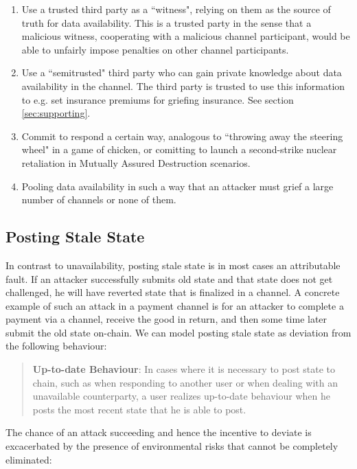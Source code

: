 \documentclass[prb,floatfix,reprint,nofootinbib,amsmath,amssymb,epsfig,pre,floats,letterpaper,groupedaffiliation,tightenlines,allcolors=blue,11pt]{revtex4}
\theoremstyle{definition}
\theoremstyle{definition}
\theoremstyle{definition}
\begin{document}
\begin{enumerate}
    \item Use a trusted third party as a ``witness", relying on them as the source of truth for data availability. This is a trusted party in the sense that a malicious witness, cooperating with a malicious channel participant, would be able to unfairly impose penalties on other channel participants.
    \item Use a ``semitrusted" third party who can gain private knowledge about data availability in the channel. The third party is trusted to use this information to e.g. set insurance premiums for griefing insurance. See section \ref{sec:supporting}.
    \item Commit to respond a certain way, analogous to ``throwing away the steering wheel" in a game of chicken, or comitting to launch a second-strike nuclear retaliation in Mutually Assured Destruction scenarios.
    \item Pooling data availability in such a way that an attacker must grief a large number of channels or none of them.
\end{enumerate}

\subsection{Posting Stale State}

In contrast to unavailability, posting stale state is in most cases an attributable fault. If an attacker successfully submits old state and that state does not get challenged, he will have reverted state that is finalized in a channel. A concrete example of such an attack in a payment channel is for an attacker to complete a payment via a channel, receive the good in return, and then some time later submit the old state on-chain. We can model posting stale state as deviation from the following behaviour:

\begin{quote}
\textbf{Up-to-date Behaviour}: In cases where it is necessary to post state to chain, such as when responding to another user or when dealing with an unavailable counterparty, a user realizes up-to-date behaviour when he posts the most recent state that he is able to post.
\end{quote}

The chance of an attack succeeding and hence the incentive to deviate is excacerbated by the presence of environmental risks that cannot be completely eliminated:
\end{document}
